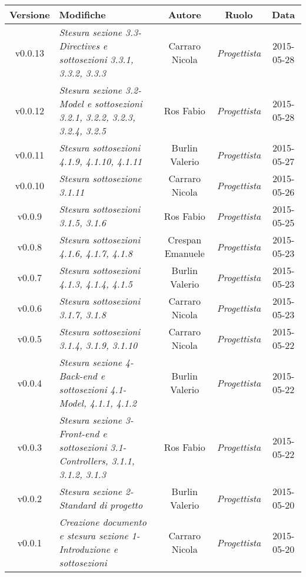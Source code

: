\newpage
\begin{table}[h]
\centering
\begin{tabular}{|c|p{}|c|c|c|}
	\toprule
		\textbf{Versione} & \textbf{Modifiche} & \textbf{Autore} & \textbf{Ruolo} & \textbf{Data}\\
	\midrule
	\midrule
		v0.0.13 & \textit{Stesura sezione 3.3-Directives e sottosezioni 3.3.1, 3.3.2, 3.3.3} & Carraro Nicola & \textit{Progettista} & 2015-05-28\\
	\midrule
		v0.0.12 & \textit{Stesura sezione 3.2-Model e sottosezioni 3.2.1, 3.2.2, 3.2.3, 3.2.4, 3.2.5} & Ros Fabio & \textit{Progettista} & 2015-05-28\\
	\midrule
		v0.0.11 & \textit{Stesura sottosezioni 4.1.9, 4.1.10, 4.1.11} & Burlin Valerio & \textit{Progettista} & 2015-05-27\\
	\midrule
		v0.0.10 & \textit{Stesura sottosezione 3.1.11} & Carraro Nicola & \textit{Progettista} & 2015-05-26\\
	\midrule
		v0.0.9 & \textit{Stesura sottosezioni 3.1.5, 3.1.6} & Ros Fabio & \textit{Progettista} & 2015-05-25\\
	\midrule
		v0.0.8 & \textit{Stesura sottosezioni 4.1.6, 4.1.7, 4.1.8} & Crespan Emanuele & \textit{Progettista} & 2015-05-23\\
	\midrule
		v0.0.7 & \textit{Stesura sottosezioni 4.1.3, 4.1.4, 4.1.5} & Burlin Valerio & \textit{Progettista} & 2015-05-23\\
	\midrule
		v0.0.6 & \textit{Stesura sottosezioni 3.1.7, 3.1.8} & Carraro Nicola & \textit{Progettista} & 2015-05-23\\
	\midrule
		v0.0.5 & \textit{Stesura sottosezioni 3.1.4, 3.1.9, 3.1.10} & Carraro Nicola & \textit{Progettista} & 2015-05-22\\
	\midrule
		v0.0.4 & \textit{Stesura sezione 4-Back-end e sottosezioni 4.1-Model, 4.1.1, 4.1.2} & Burlin Valerio & \textit{Progettista} & 2015-05-22\\
	\midrule
		v0.0.3 & \textit{Stesura sezione 3-Front-end e sottosezioni 3.1-Controllers, 3.1.1, 3.1.2, 3.1.3} & Ros Fabio & \textit{Progettista} & 2015-05-22\\
	\midrule
		v0.0.2 & \textit{Stesura sezione 2-Standard di progetto} & Burlin Valerio & \textit{Progettista} & 2015-05-20\\
	\midrule
		v0.0.1 & \textit{Creazione documento e stesura sezione 1-Introduzione e sottosezioni} & Carraro Nicola & \textit{Progettista} & 2015-05-20\\
	
	\bottomrule
	
\end{tabular}
\end{table}
\newpage